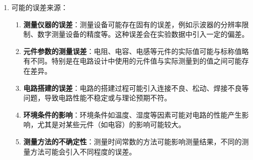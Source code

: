 \documentclass[dvipsnames, svgnames,a4paper,11pt]{article}
\begin{document}
\begin{enumerate}
		\item 可能的误差来源：
		
		\begin{enumerate}
			\item \textbf{测量仪器的误差}：测量设备可能存在固有的误差，例如示波器的分辨率限制、数字测量设备的精度等。这种误差会在实验数据中引入一定的偏差。
			
			\item \textbf{元件参数的测量误差}：电阻、电容、电感等元件的实际值可能与标称值略有不同。特别是在电路设计中使用的元件值与实际测量到的值之间可能存在差异。
			
			\item \textbf{电路搭建的误差}：电路的搭建过程可能引入连接不良、松动、焊接不良等问题，导致电路性能不稳定或与理论预期不符。
			
			\item \textbf{环境条件的影响}：环境条件如温度、湿度等因素可能对电路的性能产生影响，尤其是对某些元件（如电容）的影响可能较大。
			
			\item \textbf{测量方法的不确定性}：测量时间常数的方法可能影响测量结果，不同的测量方法可能会引入不同程度的误差。
		\end{enumerate}
	\end{enumerate}
	
\end{document}
